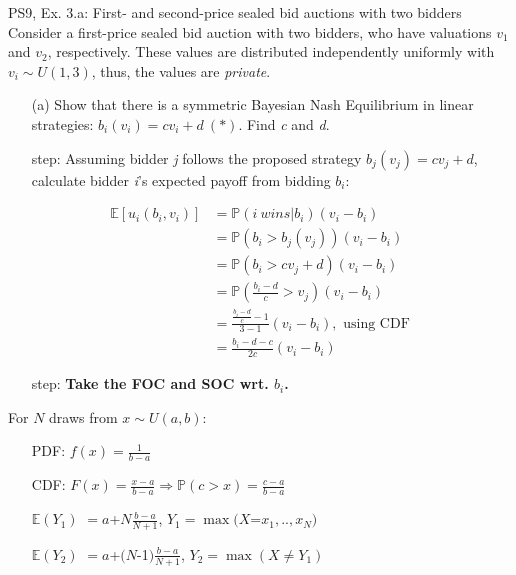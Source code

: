 \begin{frame}{PS9, Ex. 3.a: First- and second-price sealed bid auctions with two bidders}
    Consider a first-price sealed bid auction with two bidders, who have valuations $v_1$ and $v_2$, respectively. These values are distributed independently uniformly with $v_i\sim U(1,3)$, thus, the values are \textit{private}.
    \vspace{-4pt}
    \begin{itemize}
      \item[(a)] Show that there is a symmetric Bayesian Nash Equilibrium in linear strategies: $b_i(v_i) = cv_i + d\ (*)$. Find \textit{c} and \textit{d}.
    \end{itemize}
    \vspace{-8pt}
    \begin{multicols}{2}
      \begin{itemize}
        \item[\nth{1} step:] Assuming bidder \textit{j} follows the proposed strategy $b_j(v_j) = cv_j + d$, calculate bidder \textit{i}'s expected payoff from bidding $b_i$:
      \end{itemize}
      \vspace{-4pt}
      \begin{align*}
        \mathbb{E}[u_i(b_i,v_i)]&=\mathbb{P}(i\ wins|b_i)(v_i-b_i)\\
                                &=\mathbb{P}(b_i>b_j(v_j))(v_i-b_i)\\
                                &=\mathbb{P}(b_i>cv_j+d)(v_i-b_i)\\
                                &=\mathbb{P}\left(\frac{b_i-d}{c}>v_j\right)(v_i-b_i)\\
                                &=\frac{\frac{b_i-d}{c}-1}{3-1}(v_i-b_i),\text{ using CDF}\\
                                &=\frac{b_i-d-c}{2c}(v_i-b_i)
      \end{align*}
      \vspace{-10pt}
      \begin{itemize}
        \item[\nth{2} step:] \textbf{Take the FOC and SOC wrt. $b_i$.}
      \end{itemize}
      \vfill\null\columnbreak
      For $N$ draws from $x\sim U(a, b):$
      \vspace{-6pt}
      \begin{enumerate}
        \item[PDF:] $f(x)=\frac{1}{b-a}$
        \item[CDF:] $F(x)=\frac{x-a}{b-a}\Rightarrow\mathbb{P}(c>x)=\frac{c-a}{b-a}$
        \item[$\mathbb{E}(Y_1)$] $=a$+$N\frac{b-a}{N+1}$, $Y_1=\max(X$=$x_1,..,x_N)$
        \item[$\mathbb{E}(Y_2)$] $=a$+$(N$-1$)\frac{b-a}{N+1}$, $Y_2=\max(X\neq Y_1)$
      \end{enumerate}
      \vfill\null
    \end{multicols}
\end{frame}
